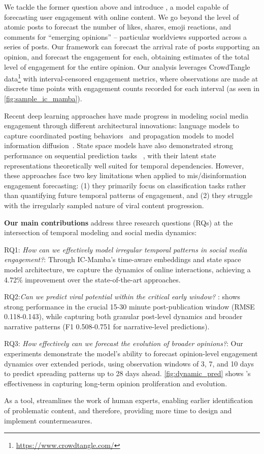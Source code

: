 We tackle the former question above and introduce \icmamba, a model capable of forecasting user engagement with online content. We go beyond the level of atomic posts to forecast the number of likes, shares, emoji reactions, and comments for ``emerging opinions'' – particular worldviews supported across a series of posts.
Our framework can forecast the arrival rate of posts supporting an opinion, and forecast the engagement for each, obtaining estimates of the total level of engagement for the entire opinion.
Our analysis leverages CrowdTangle data\footnote{\url{https://www.crowdtangle.com/}} with interval-censored engagement metrics, where observations are made at discrete time points with engagement counts recorded for each interval (as seen in \cref{fig:sample_ic_mamba}).

Recent deep learning approaches have made progress in modeling social media engagement through different architectural innovations: language models to capture coordinated posting behaviors~\citep{atanasov2019predicting,tian2023metatroll} and propagation models to model information diffusion~\citep{zannettou2019disinformation,im2020still,luceri2024unmasking,kong2023interval}. State space models have also demonstrated strong performance on sequential prediction tasks ~\citep{mamba,mamba2}, with their latent state representations theoretically well suited for temporal dependencies. However, these approaches face two key limitations when applied to mis/disinformation engagement forecasting: (1) they primarily focus on classification tasks rather than quantifying future temporal patterns of engagement, and (2) they struggle with the irregularly sampled nature of viral content progression.


\noindent\textbf{Our main contributions} address three research questions (RQs) at the intersection of temporal modeling and social media dynamics:

RQ1: \textit{How can we effectively model irregular temporal patterns in social media engagement?}: Through IC-Mamba's time-aware embeddings and state space model architecture, we capture the dynamics of online interactions, achieving a 4.72\% improvement over the state-of-the-art approaches. 

RQ2:\textit{Can we predict viral potential within the critical early window? }: \icmamba shows strong performance in the crucial 15-30 minute post-publication window (RMSE 0.118-0.143), while capturing both granular post-level dynamics and broader narrative patterns (F1 0.508-0.751 for narrative-level predictions).

RQ3: \textit{How effectively can we forecast the evolution of broader opinions?}: Our experiments demonstrate the model's ability to forecast opinion-level engagement dynamics over extended periods, using observation windows of 3, 7, and 10 days to predict spreading patterns up to 28 days ahead. \cref{fig:dynamic_pred} shows \icmamba's effectiveness in capturing long-term opinion proliferation and evolution.

As a tool, \icmamba streamlines the work of human experts, enabling earlier identification of problematic content, and therefore, providing more time to design and implement countermeasures.